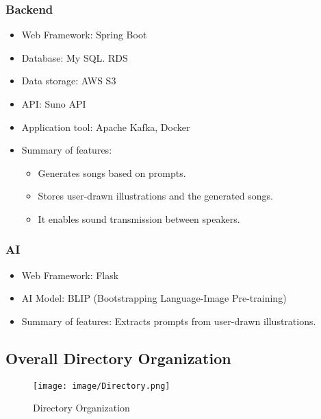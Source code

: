 \documentclass[conference]{IEEEtran}
\begin{document}
 \subsubsection{Backend}
\begin{itemize}
    \item Web Framework: Spring Boot\\
    \item Database: My SQL. RDS\\
    \item Data storage: AWS S3\\
    \item API: Suno API\\
    \item Application tool: Apache Kafka, Docker 
    \item Summary of features:
\begin{itemize}
    \item Generates songs based on prompts.\\
    \item Stores user-drawn illustrations and the generated songs.\\
    \item It enables sound transmission between speakers.\\
\end{itemize}
\end{itemize}

\subsubsection{AI}
\begin{itemize}
    \item Web Framework: Flask\\
    \item AI Model: BLIP (Bootstrapping Language-Image Pre-training)\\
    \item Summary of features: Extracts prompts from user-drawn illustrations.\\
\end{itemize}


\subsection{Overall Directory Organization}

\begin{figure}[h!]
    \centering
    \texttt{[image: image/Directory.png]}
    \caption{Directory Organization}
    \label{fig:enter-label}
\end{figure}
\end{document}
